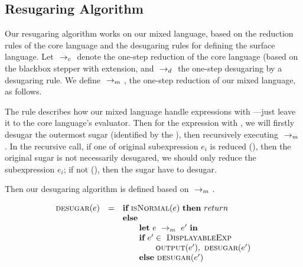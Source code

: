 \subsection{Resugaring Algorithm}

Our resugaring algorithm works on our mixed language, based on the reduction rules of the core language and the desugaring rules for defining the surface language. Let $~\rightarrow_c~$ denote the one-step reduction of the core language (based on the blackbox stepper with extension, and $~\rightarrow_d~$ the one-step desugaring by a desugaring rule. We define $~\rightarrow_m~$, the one-step reduction of our mixed language, as follows.

{}

{}

{
}

The  rule describes how our mixed language handle expressions with ---just leave it to the core language's evaluator. Then for the expression with , we will firstly desugar the outermost sugar (identified by the ), then recursively executing $~\rightarrow_m~$. In the recursive call, if one of original subexpression $e_i$ is reduced (), then the original sugar is not necessarily desugared, we should only reduce the subexpression $e_i$; if not (), then the sugar have to desugar.


Then our desugaring algorithm is defined based on $~\rightarrow_m~$.

\[
\begin{array}{llll}
\mbox{\sc desugar} (e) &=& \mbox{\rm \bf if}~\mbox{\sc isNormal}(e)~\mbox{\rm \bf then}~return\\
              & & \mbox{\rm \bf else}~\\
							& & \qquad \mbox{\rm \bf let}~e ~\rightarrow_m~e'~\mbox{\rm \bf in}\\
							& & \qquad \mbox{\rm \bf if}~e' \in~\mbox{\sc DisplayableExp} \\
							& & \qquad \qquad \mbox{\sc output}(e'),~\mbox{\sc desugar}(e')\\
							& & \qquad \mbox{\rm \bf else}~\mbox{\sc desugar}(e')
\end{array}
\]

